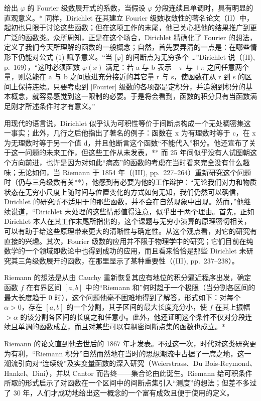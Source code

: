 给出 \(\varphi\) 的 Fourier 级数展开式的系数，当假设 \(\varphi\) 分段连续且单调时，具有明显的直观意义。* 同样，Dirichlet 在其建立 Fourier 级数收敛性的著名论文（II）中，起初也只限于讨论这些函数；但在这项工作的末尾，他已关心把他的结果推广到更广泛的函数类。众所周知，正是在这个场合，Dirichlet 精确化了 Fourier 的想法，定义了我们今天所理解的函数的一般概念；自然，首先要弄清的一点是：在哪些情形下仍能对公式 (1) 赋予意义。“当 {[}\(\varphi\){]} 的间断点为无穷多个 \ldots”Dirichlet 说（(II), p.~169），“这时必须函数 \(\varphi(x)\) 满足：若 a 与 b 表示 \(-\pi\) 与 \(+\pi\) 之间任意两个量，则总能在 a 与 b 之间放进充分接近的其它量 r 与 s，使函数在从 r 到 s 的区间上保持连续。只要考虑到 {[}Fourier{]} 级数的各项都是定积分，并追溯到积分的基本概念，就容易感觉到这一限制的必要。于是将会看到，函数的积分只有当函数满足刚才所述条件时才有意义。”

用现代的语言说，Dirichlet 似乎认为可积性等价于间断点构成一个无处稠密集这一事实；此外，几行之后他指出了著名的例子：函数在 x 为有理数时等于 c，在 x 为无理数时等于另一个值 d，并且他断言这个函数“不能代入”积分。他还宣布了关于这一问题的未来工作，但这些工作从未发表，** 而 25 年间似乎没有人试图朝这个方向前进，也许是因为对如此“病态”的函数的考虑在当时看来完全没有什么趣味；无论如何，当 Riemann 于 1854 年（(III), pp.~227--264）重新研究这个问题时（仍与三角级数有关**），他感到有必要为他的工作辩护：“无论我们对力和物质状态在无穷小尺度上随时间与位置变化的方式如何无知，我们仍然可以确信，Dirichlet 的研究所不适用于的那些函数，并不会在自然现象中出现。然而，”他继续说道，“Dirichlet 未处理的这些情形值得注意，似乎出于两个理由。首先，正如 Dirichlet 本人在其工作末尾所指出的，这个课题与无穷小演算的原理密切相关，可以有助于给这些原理带来更大的清晰性与确定性。从这个观点看，对它的研究有直接的兴趣。其次，Fourier 级数的应用并不限于物理学中的研究；它们目前在纯数学的一个领域即数论中也得到成功的应用，而且看来恰恰是那些 Dirichlet 未研究其三角级数展开的函数，在那里显示了某种重要性（(III), pp.~237--238）。

Riemann 的想法是从由 Cauchy 重新恢复其应有地位的积分逼近程序出发，确定函数 \(f\) 在有界区间 \([a, b]\) 中的“Riemann 和”何时趋于一个极限（当分割各区间的最大长度趋于 0 时），这个问题他毫不困难地得到了解答，形式如下：对每个 \(\alpha > 0\)，存在 \([a, b]\) 的一个分割，其子区间的最大长度充分小，使 \(f\) 在其上振幅 \(>\alpha\) 的该分割各区间的长度之和任意小。此外，他还证明这个条件不仅对分段连续且单调的函数成立，而且对某些可以有稠密间断点集的函数也成立。*

Riemann 的论文直到他去世后的 1867 年才发表。不过这一次，时代对这类研究更为有利，“Riemann 积分”自然而然地在当时的思想潮流中占据了一席之地，这一潮流引向对“连续统”及实变量函数的深入研究（Weierstrass、Du Bois-Reymond、Hankel、Dini），并以 Cantor 而告终——集合论由此诞生。Riemann 给可积条件所取的形式启示了对函数在一个区间中的间断点集引入“测度”的想法；但差不多过了 30 年，人们才成功地给出这一概念的一个富有成效且便于使用的定义。

